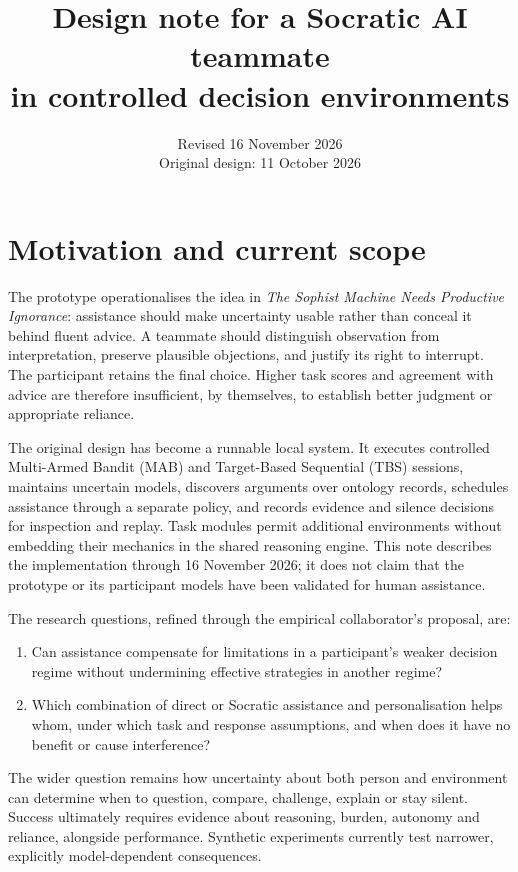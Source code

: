 \documentclass[11pt,a4paper]{article}
\title{\textbf{Design note for a Socratic AI teammate\\in controlled decision environments}}
\author{}
\date{Revised 16 November 2026\\{\small Original design: 11 October 2026}}
\begin{document}
\maketitle
\vspace{-2em}

\section{Motivation and current scope}
The prototype operationalises the idea in \emph{The Sophist Machine Needs Productive Ignorance}: assistance should make uncertainty usable rather than conceal it behind fluent advice. A teammate should distinguish observation from interpretation, preserve plausible objections, and justify its right to interrupt. The participant retains the final choice. Higher task scores and agreement with advice are therefore insufficient, by themselves, to establish better judgment or appropriate reliance.

The original design has become a runnable local system. It executes controlled Multi-Armed Bandit (MAB) and Target-Based Sequential (TBS) sessions, maintains uncertain models, discovers arguments over ontology records, schedules assistance through a separate policy, and records evidence and silence decisions for inspection and replay. Task modules permit additional environments without embedding their mechanics in the shared reasoning engine. This note describes the implementation through 16 November 2026; it does not claim that the prototype or its participant models have been validated for human assistance.

The research questions, refined through the empirical collaborator's proposal, are:
\begin{enumerate}
\item Can assistance compensate for limitations in a participant's weaker decision regime without undermining effective strategies in another regime?
\item Which combination of direct or Socratic assistance and personalisation helps whom, under which task and response assumptions, and when does it have no benefit or cause interference?
\end{enumerate}
The wider question remains how uncertainty about both person and environment can determine when to question, compare, challenge, explain or stay silent. Success ultimately requires evidence about reasoning, burden, autonomy and reliance, alongside performance. Synthetic experiments currently test narrower, explicitly model-dependent consequences.
\end{document}

